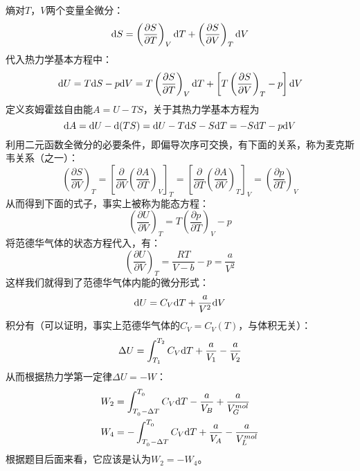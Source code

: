 \begin{solution}
        熵对$T$，$V$两个变量全微分：
        \begin{equation*}
            \mathrm{d} S = \left(\frac{\partial S}{\partial T}\right)_{V} \mathrm{d} T + \left(\frac{\partial S}{\partial V}\right)_{T} \mathrm{d} V
        \end{equation*}
        代入热力学基本方程中：
        \begin{equation*}
            \mathrm{d} U = T\mathrm{d} S - p \mathrm{d} V 
            = T\left(\frac{\partial S}{\partial T}\right)_{V} \mathrm{d} T + \left[T\left(\frac{\partial S}{\partial V}\right)_{T} - p\right] \mathrm{d} V
        \end{equation*}
        定义亥姆霍兹自由能$A=U-TS$，关于其热力学基本方程为            
        \begin{equation*}
            \mathrm{d}{A} = \mathrm{d} U - \mathrm{d} (TS) = \mathrm{d} U - T \mathrm{d} S - S \mathrm{d} T = -S\mathrm{d}{T} - p\mathrm{d}{V}
        \end{equation*}
        利用二元函数全微分的必要条件，即偏导次序可交换，有下面的关系，称为麦克斯韦关系（之一）：
        \begin{equation*}
            \left(\frac{\partial S}{\partial V}\right)_{T} 
            =\left[\frac{\partial}{\partial V}\left(\frac{\partial A}{\partial T}\right)_V \right]_T 
            =\left[\frac{\partial}{\partial T}\left(\frac{\partial A}{\partial V}\right)_T \right]_V 
            =\left(\frac{\partial p}{\partial T}\right)_{V}
        \end{equation*}
        从而得到下面的式子，事实上被称为能态方程：
        \begin{equation*}
            \left(\frac{\partial U}{\partial V}\right)_{T} = T\left(\frac{\partial p}{\partial T}\right)_{V} - p
        \end{equation*}
        将范德华气体的状态方程代入，有：
        \begin{equation*}
            \left(\frac{\partial U}{\partial V}\right)_{T} = \frac{RT}{V-b} - p = \frac{a}{V^{2}}
        \end{equation*}
        这样我们就得到了范德华气体内能的微分形式：
        \begin{equation*}
            \mathrm{d} U = C_{V}\mathrm{d} T + \frac{a}{V^{2}}\mathrm{d} V
        \end{equation*}
        积分有（可以证明，事实上范德华气体的$C_{V} = C_{V}(T)$，与体积无关）：
        \begin{equation*}
            \Delta U = \int_{T_1}^{T_2}C_{V}\mathrm{d} T + \frac{a}{V_1} - \frac{a}{V_2} 
        \end{equation*}
        从而根据热力学第一定律$\Delta U = -W$：
        \begin{equation*}
            \begin{aligned}
                & W_2 = \int_{T_{_0}-\Delta T}^{T_{_0}}C_{V}\mathrm{d} T - \frac{a}{V_{B}} + \frac{a}{V_{G}^{mol}}  \\
                & W_4 = -\int_{T_{_0}-\Delta T}^{T_{_0}}C_{V}\mathrm{d} T + \frac{a}{V_{A}} - \frac{a}{V_{L}^{mol}} 
            \end{aligned}
        \end{equation*}
        根据题目后面来看，它应该是认为$W_2 = -W_4$。


\end{solution}
